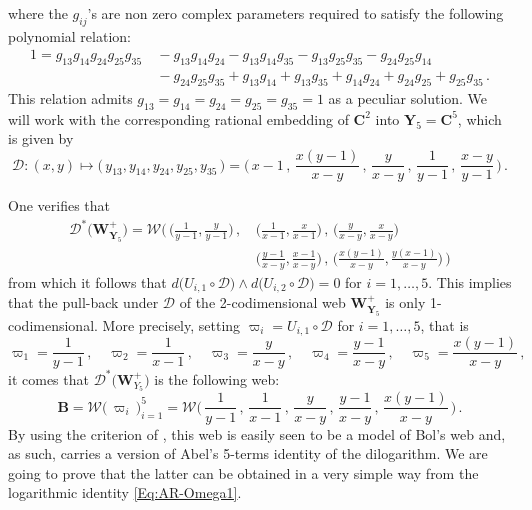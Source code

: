 \documentclass[11pt]{amsart}
\begin{document}
where the $g_{ij}$'s are non zero complex parameters required to satisfy the following polynomial relation:
\begin{align*}
1=g_{1  3} g_{1  4} g_{2  4} g_{2  5} g_{3  5}&\   -g_{1  3} g_{1  4} g_{2  4}-g_{1  3} g_{1  4} g_{3  5}-g_{1  3} g_{2  5} g_{3  5}-g_{2  4} g_{2  5} g_{1  4} \\
&\  -g_{2  4} g_{2  5} g_{3  5}  +g_{1  3} g_{1  4}+g_{1  3} g_{3  5}+g_{1  4} g_{2  4}+g_{2  4} g_{2  5}+g_{2  5} g_{3  5}\,.
\end{align*}
This relation admits $g_{13}=g_{14}=g_{24}=g_{25}=g_{35}=1$ as a peculiar solution.  We will work with the corresponding rational embedding of $\mathbf C^2 $ into $\boldsymbol{Y}_5=\mathbf C^5$, which is given by 
\begin{equation} %
\label{Eq:map-D} 
{\mathcal D} : (x,y)\longmapsto \big(\,
 y_{13}, y_{14}, y_{24}, y_{25}, y_{35} \,\big)= 
\bigg(\,  x -1
\, , \, 
 \frac{x \left(y -1\right)}{x -y}
\, , \, 
 \frac{y}{x -y}
\, , \, 
\frac{1}{y -1}
 \, , \, 
 \frac{x -y}{y -1}\, \bigg)\, .
 \end{equation} %
 
 
One verifies that 
\begin{align*}
{\mathcal D}^*\Big(  \boldsymbol{ W}^{+}_{ \boldsymbol{Y}_5}
\Big) 
=\boldsymbol{\mathcal W} 
\Bigg( \, \bigg(\frac{1}{y -1} ,   \frac{y}{y -1}\bigg)
\, , & \, 
\bigg(
\frac{1}{x -1}, \frac{x}{x -1}\bigg)\, ,  \,\bigg(\frac{y}{x -y}, \frac{x}{x -y}\bigg)
\, 
\\ 
&\, 
  \bigg(\frac{y -1}{x -y}, \frac{x -1}{x -y}
\bigg)
\, , \, 
 \bigg(\frac{x \left(y -1\right)}{x -y}, 
\frac{y\left(x -1\right)}{x -y}\bigg)\, \Bigg)
\end{align*} 
from which it follows that $d\big({U_{i,1}}\circ {\mathcal D}\big)\wedge 
d\big({U_{i,2}}\circ {\mathcal D}\big)=0$ for $i=1,\ldots,5$.  This implies that the pull-back under $\mathcal D$ of the 2-codimensional web $\boldsymbol{W}^{+}_{ \boldsymbol{Y}_5}$ is only 1-codimensional. More precisely, setting $\varpi_i={U_{i,1}}\circ {\mathcal D}$ for $i=1,\ldots,5$, that is 
$$
\varpi_1= \frac{1}{y -1} 
\, , \quad 
\varpi_2=
\frac{1}{x -1} 
\, , \quad 
\varpi_3 = \frac{y}{x -y} 
\, , \quad 
\varpi_4 =  \frac{y -1}{x-y}
\, , \quad 
\varpi_5 = \frac{x(y -1)}{x -y}\, ,
$$
it comes that ${\mathcal D}^*\Big(  \boldsymbol{W}^{+}_{ {Y}_5}
\Big) $ is the following web: $$
\boldsymbol{B}=
\boldsymbol{\mathcal W}\Big(\, \varpi_i\, \Big)_{i=1}^5 = 
\boldsymbol{\mathcal W}\bigg(\, 
\frac{1}{y -1} 
\, ,\, 
\frac{1}{x -1} 
\, ,\, 
 \frac{y}{x -y} 
\, ,\, 
 \frac{y -1}{x-y}
\, ,\, 
 \frac{x(y -1)}{x -y}
\, 
\bigg) \, .
$$ 
By using the criterion of \cite[\S3.5.2]{PirioAFST}, 
this web is easily seen  to be a model of Bol's web and, as such, 
carries a version of Abel's 5-terms identity of the dilogarithm. We are going to prove that the latter can be obtained in a very simple way from the logarithmic identity \eqref{Eq:AR-Omega1}. 
\end{document}
